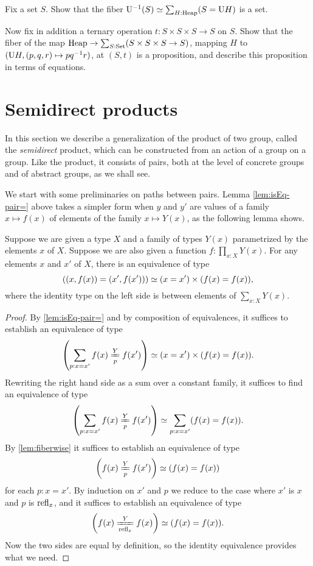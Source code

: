 \begin{exercise}\label{xca:heap-variety}
  Fix a set $S$.
  Show that the fiber $\inv{\USym}(S)\jdeq\sum_{H:\Heap}(S=\USym H)$ is a set.

  Now fix in addition a ternary operation $t:S\times S\times S\to S$ on $S$.
  Show that the fiber of the map $\mathrm{Heap} \to \sum_{S:\mathrm{Set}}(S\times S\times S \to S)$,
  mapping $H$ to $(\mathrm{U} H,(p,q,r)\mapsto p q^{-1} r)$,
  at $(S,t)$ is a proposition,
  and describe this proposition in terms of equations.
\end{exercise}

\section{Semidirect products}
\label{sec:Semidirect-products}

In this section we describe a generalization of the product of two group, called the {\em semidirect} product, which can be constructed from an
action of a group on a group.  Like the product, it consists of pairs, both at the level of concrete groups and of abstract groups, as we shall
see.

We start with some preliminaries on paths between pairs. 
Lemma \cref{lem:isEq-pair=} above takes a simpler form when $y$ and $y'$ are values of a family $x \mapsto f(x)$
of elements of the family $x \mapsto Y(x)$, as the following lemma shows.

\begin{lemma}\label{lem:pathpairsection}
  Suppose we are given a type $X$ and a family of types $Y(x)$ parametrized by the elements $x$ of $X$.
  Suppose we are also given a function $f : \prod_{x:X} Y(x)$.
  For any elements $x$ and $x'$ of $X$,
  there is an equivalence of type
  $$\left ( (x,f(x)) = (x',f(x')) \right ) \simeq (x=x') \times (f(x) = f(x)),$$
  where the identity type on the left side is between elements of $\sum_{x:X} Y(x)$.
\end{lemma}

\begin{proof}
  By \cref{lem:isEq-pair=} and by composition of equivalences, it suffices to establish an equivalence of type
  $$\left( \sum_{p:x=x'} \pathover {f(x)} Y p {f(x')} \right) \weq (x=x') \times (f(x) = f(x)).$$
  Rewriting the right hand side as a sum over a constant family, it suffices to find an equivalence of type
  $$\left( \sum_{p:x=x'} \pathover {f(x)} Y p {f(x')} \right) \weq \sum_{p:x=x'} (f(x) = f(x)).$$
  By \cref{lem:fiberwise} it suffices to establish an equivalence of type 
  $$ \left( \pathover {f(x)} Y p {f(x')} \right) \weq (f(x) = f(x))$$
  for each $p:x=x'$.  By induction on $x'$ and $p$ we reduce to the case where $x'$ is $x$ and $p$ is $\refl x$, and it suffices to establish an
  equivalence of type 
  $$ \left( \pathover {f(x)} Y {\refl x} {f(x)} \right) \weq (f(x) = f(x)).$$
  Now the two sides are equal by definition, so the identity equivalence provides what we need.  
\end{proof}

